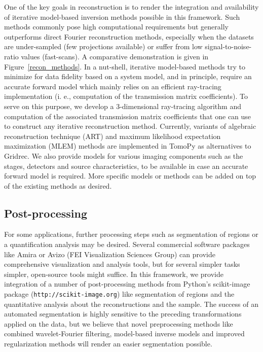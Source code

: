 \documentclass[pdf]{iucr}              %
\begin{document}
One of the key goals in reconstruction is to render the integration and availability of iterative model-based inversion methods possible in this framework. Such methods commonly pose high computational requirements but generally outperforms direct Fourier reconstruction methods, especially when the datasets are under-sampled (few projections available) or suffer from low signal-to-noise-ratio values (fast-scans). A comparative demonstration is given in Figure~\ref{recon_methods}. In a nut-shell, iterative model-based methods try to minimize for data fidelity based on a system model, and in principle, require an accurate forward model which mainly relies on an efficient ray-tracing implementation (i. e., computation of the transmission matrix coefficients). To serve on this purpose, we develop a 3-dimensional ray-tracing algorithm and computation of the associated transmission matrix coefficients that one can use to construct any iterative reconstruction method. Currently, variants of algebraic reconstruction technique (ART) \cite{Gordon1970}  and maximum likelihood expectation maximization (MLEM) \cite{Dempster1977} methods are implemented in TomoPy as alternatives to Gridrec. We also provide models for various imaging components such as the stages, detectors and source characteristics, to be available in case an accurate forward model is required. More specific models or methods can be added on top of the existing methods as desired.

\subsection{Post-processing}

For some applications, further processing steps such as segmentation of regions or a quantification analysis may be desired. Several commercial software packages like Amira or Avizo (FEI Visualization Sciences Group) can provide comprehensive visualization and analysis tools, but for several simpler tasks simpler, open-source tools might suffice. In this framework, we provide integration of a number of post-processing methods from Python's scikit-image package (\texttt{http://scikit-image.org}) like segmentation of regions and the quantitative analysis about the reconstructions and the sample. The success of an automated segmentation is highly sensitive to the preceding transformations applied on the data, but we believe that novel preprocessing methods like combined wavelet-Fourier filtering, model-based inverse models and improved regularization methods will render an easier segmentation possible. 
\end{document}
